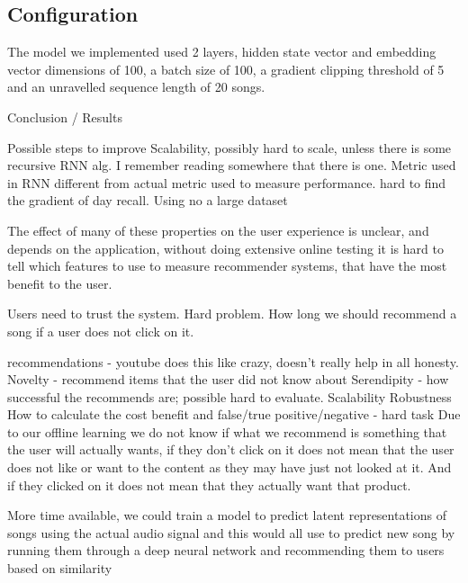 \documentclass{article} %
\begin{document}
\subsection{Configuration}
The model we implemented used 2 layers, hidden state vector and embedding vector dimensions of 100, a batch size of 100, a gradient clipping threshold of 5 and an unravelled sequence length of 20 songs. 

Conclusion / Results


Possible steps to improve
Scalability, possibly hard to scale, unless there is some recursive RNN alg. I remember reading somewhere that there is one.
Metric used in RNN different from actual metric used to measure performance.
	hard to find the gradient of day recall.
Using no a large dataset

The effect of many of these properties on the user experience is unclear, and depends on the application, without doing extensive online testing it is hard to tell which features to use to measure recommender systems, that have the most benefit to the user.

Users need to trust the system. Hard problem. How long we should recommend a song if a user does not click on it.

recommendations - youtube does this like crazy, doesn’t really help in all honesty.
Novelty - recommend items that the user did not know about
Serendipity - how successful the recommends are; possible hard to evaluate. 
Scalability 
Robustness
How to calculate the cost benefit and false/true positive/negative - hard task
Due to our offline learning we do not know if what we recommend is something that the user will actually wants, if they don’t click on it does not mean that the user does not like or want to the content as they may have just not looked at it. And if they clicked on it does not mean that they actually want that product.

More time available, we could train a model to predict latent representations of songs using the actual audio signal and this would all use to predict new song by running them through a deep neural network and recommending them to users based on similarity
\end{document}
